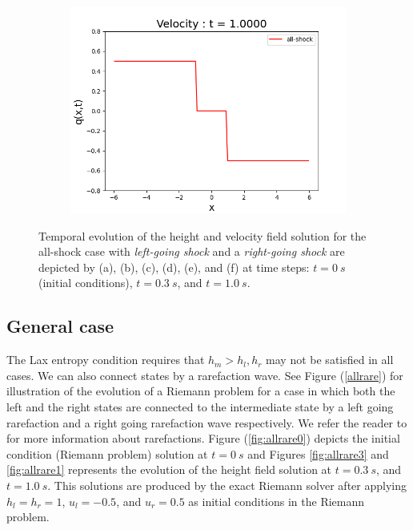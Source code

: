 \documentclass[9pt,a4paper]{article}
\newcommand{\Fig}[1]{Figure (\ref{fig:#1})}
\begin{document}
\begin{figure}[H]
\begin{subfigure}{0.33\textwidth}
			\includegraphics[width=\linewidth]{images/allshockv1}
			\caption{}
			\label{fig:allshockv1}
		\end{subfigure}
		\caption{Temporal evolution of the height and velocity field solution for the all-shock case with {\em left-going shock} and a {\em right-going shock}  are depicted by (a), (b), (c), (d), (e), and (f) at time steps: $t=0~s$ (initial conditions), $t = 0.3~s$, and $t = 1.0~s$. }
		\label{fig:allshock}
	\end{figure}
	
	\subsection{General case}
	The Lax entropy condition requires that $h_m > h_l, h_r$ may not be satisfied in all cases.  We can also connect states by a rarefaction wave. See Figure (\ref{allrare})  for illustration of the evolution of a Riemann problem  for a case in which both the left and  the right states are connected to the intermediate state by a left going rarefaction and a right going rarefaction wave  respectively.   We refer the reader to   \citet{leveque2002finite} for more information about rarefactions.  \Fig{allrare0} depicts the initial condition (Riemann problem) solution at  $t=0~s$  and Figures \ref{fig:allrare3} and \ref{fig:allrare1} represents the evolution of the height field solution at $t = 0.3~s$, and $t = 1.0~s$.  This solutions are produced by the exact Riemann solver after applying $h_l = h_r = 1$, $u_l  =  -0.5$, and $u_r = 0.5$ as initial conditions in  the Riemann problem.
	
\end{document}
